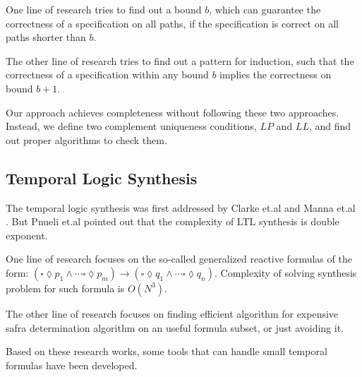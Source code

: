\documentclass[journal]{IEEEtran}
\begin{document}
One line of research\cite{bmc_tacas99,RecDiam} tries to find out a bound $b$,
which can guarantee the correctness of a specification on all paths,
if the specification is correct on all paths shorter than $b$.

The other line of research\cite{kind_tacas99} tries to find out a pattern for induction,
such that the correctness of a specification within any bound $b$ implies the correctness on bound $b+1$.

Our approach achieves completeness without following these two approaches.
Instead,
we define two complement uniqueness conditions,
$LP$ and $LL$,
and find out proper algorithms to check them.


\subsection{Temporal Logic Synthesis}

The temporal logic synthesis was first addressed by Clarke et.al\cite{DSGSYNTMPLG} and Manna et.al \cite{SYNTMPLGSPC}.
But Pnueli et.al \cite{SYNRCTVMD} pointed out that the complexity of LTL synthesis is double exponent.

One line of research \cite{CNTLSYNTMDAUTO,DTMGENGMELTL,SYNRCTVDES} focuses on the so-called generalized reactive formulas of the form:
$(\square \lozenge p_1 \wedge \cdots \square \lozenge p_m) \to (\square \lozenge q_1 \wedge \cdots \square \lozenge q_n)$.
Complexity of solving synthesis problem for such formula is $O(N^3)$.

The other line of research focuses on finding efficient algorithm \cite{SYNCNTLBNDRPN}
for expensive safra determination algorithm \cite{CMPLXAUTO} on an useful formula subset,
or just avoiding it\cite{NEWALGSTRGSYN}.


Based on these research works,
some tools\cite{ANZU} that can handle small temporal formulas have been developed.
\end{document}
